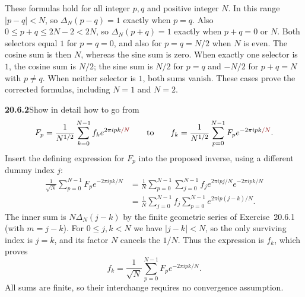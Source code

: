 These formulas hold for all integer $p,q$ and positive integer
$N$. 
In this range $|p-q|<N$, so $\Delta_N(p-q)=1$ exactly when $p=q$.
Also $0\le p+q\le2N-2<2N$, so $\Delta_N(p+q)=1$ exactly when
$p+q=0$ or $N$.
Both selectors equal $1$ for $p=q=0$, and also for
$p=q=N/2$ when $N$ is even. The cosine sum is then $N$,
whereas the sine sum is zero. When exactly one selector is
$1$, the cosine sum is $N/2$; the sine sum is $N/2$ for
$p=q$ and $-N/2$ for $p+q=N$ with $p\ne q$.
When neither selector is $1$, both sums vanish. These cases
prove the corrected formulas, including $N=1$ and $N=2$.

\par\bigskip
\noindent\textbf{20.6.2}\quad Show in detail how to go from
\[
F_{p}=\frac{1}{N^{1/2}}\sum_{k=0}^{N-1}
f_{k}e^{2\pi ipk\erratum{/N}}
\qquad\text{to}\qquad
f_{k}=\frac{1}{N^{1/2}}\sum_{p=0}^{N-1}
F_{p}e^{-2\pi ipk\erratum{/N}}.
\]
\solution
Insert the defining expression for $F_p$ into the proposed
inverse, using a different dummy index $j$:
\begin{align*}
\frac1{\sqrt N}\sum_{p=0}^{N-1}F_pe^{-2\pi ipk/N}
&=\frac1N\sum_{p=0}^{N-1}\sum_{j=0}^{N-1}
f_je^{2\pi ipj/N}e^{-2\pi ipk/N}\\
&=\frac1N\sum_{j=0}^{N-1}f_j
\sum_{p=0}^{N-1}e^{2\pi ip(j-k)/N}.
\end{align*}
The inner sum is $N\Delta_N(j-k)$ by the finite geometric
series of Exercise~20.6.1 (with $m=j-k$). For $0\le j,k<N$ we
have $|j-k|<N$, so the only surviving index is $j=k$, and its
factor $N$ cancels the $1/N$.
Thus the expression is $f_k$, which proves
\[
\boxed{f_k=\frac1{\sqrt N}\sum_{p=0}^{N-1}F_pe^{-2\pi ipk/N}}.
\]
All sums are finite, so their interchange requires no
convergence assumption. 

